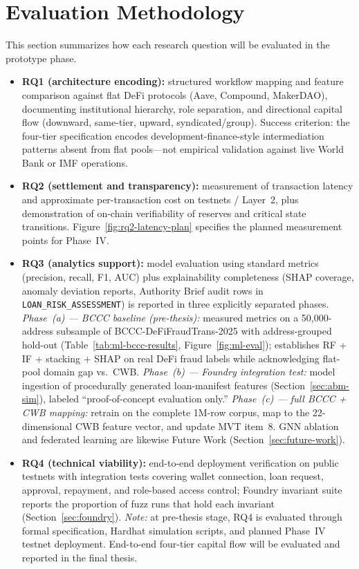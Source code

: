 \documentclass[12pt,a4paper]{report}
\begin{document}
\section{Evaluation Methodology}
\label{sec:eval-method}

This section summarizes how each research question will be evaluated in the prototype phase.
\begin{itemize}[noitemsep]
\item \textbf{RQ1 (architecture encoding):} structured workflow mapping and feature comparison against flat DeFi protocols (Aave, Compound, MakerDAO), documenting institutional hierarchy, role separation, and directional capital flow (downward, same-tier, upward, syndicated/group). Success criterion: the four-tier specification encodes development-finance-style intermediation patterns absent from flat pools---not empirical validation against live World Bank or IMF operations.
\item \textbf{RQ2 (settlement and transparency):} measurement of transaction latency and approximate per-transaction cost on testnets / Layer~2, plus demonstration of on-chain verifiability of reserves and critical state transitions. Figure~\ref{fig:rq2-latency-plan} specifies the planned measurement points for Phase~IV.
\item \textbf{RQ3 (analytics support):} model evaluation using standard metrics (precision, recall, F1, AUC) plus explainability completeness (SHAP coverage, anomaly deviation reports, Authority Brief audit rows in \texttt{LOAN\_RISK\_ASSESSMENT}) is reported in three explicitly separated phases. \textit{Phase~(a) --- BCCC baseline (pre-thesis):} measured metrics on a 50{,}000-address subsample of BCCC-DeFiFraudTrans-2025 with address-grouped hold-out (Table~\ref{tab:ml-bccc-results}, Figure~\ref{fig:ml-eval}); establishes RF + IF + stacking + SHAP on real DeFi fraud labels while acknowledging flat-pool domain gap vs.\ CWB. \textit{Phase~(b) --- Foundry integration test:} model ingestion of procedurally generated loan-manifest features (Section~\ref{sec:abm-sim}), labeled ``proof-of-concept evaluation only.'' \textit{Phase~(c) --- full BCCC + CWB mapping:} retrain on the complete 1M-row corpus, map to the 22-dimensional CWB feature vector, and update MVT item~8. GNN ablation and federated learning are likewise Future Work (Section~\ref{sec:future-work}).
\item \textbf{RQ4 (technical viability):} end-to-end deployment verification on public testnets with integration tests covering wallet connection, loan request, approval, repayment, and role-based access control; Foundry invariant suite reports the proportion of fuzz runs that hold each invariant (Section~\ref{sec:foundry}). \textit{Note:} at pre-thesis stage, RQ4 is evaluated through formal specification, Hardhat simulation scripts, and planned Phase~IV testnet deployment. End-to-end four-tier capital flow will be evaluated and reported in the final thesis.

\end{itemize}
\end{document}
